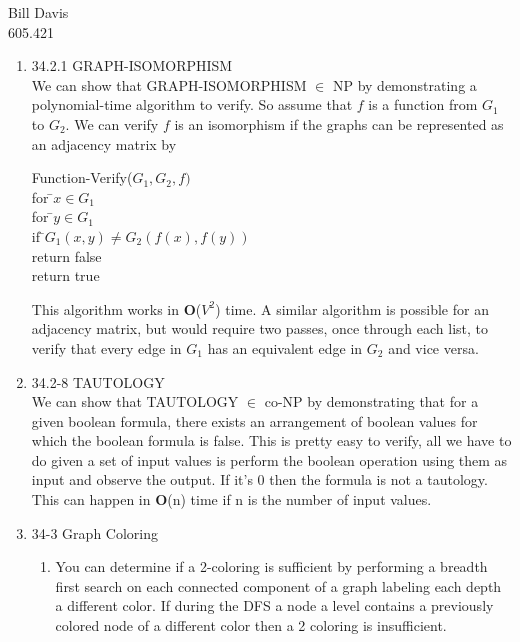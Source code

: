 \documentclass[11pt,fleqn]{article}
\begin{document}
\newcommand{\mbf}[1]{\mbox{{\bfseries #1}}}
\newcommand{\N}{\mbf{N}}
\renewcommand{\O}{\mbf{O}}

\noindent Bill Davis \\
605.421 

\begin{enumerate}
\item 34.2.1 GRAPH-ISOMORPHISM \\
We can show that GRAPH-ISOMORPHISM $\in$ NP by demonstrating a polynomial-time algorithm to verify. So assume that $f$ is a function from $G_{1}$ to $G_{2}$. We can verify $f$ is an isomorphism if the graphs can be represented as an adjacency matrix by
\begin{tabbing}
Function-Verify($G_{1},G_{2},f)$\\
for \=$x \in G_{1}$  \\
\> for \=$y \in G_{1}$ \\
\>  \> if \=$G_{1}(x,y) \neq G_{2}(f(x),f(y))$ \\
\>  \>  \> return false \\
return true 
\end{tabbing}

This algorithm works in \O($V^{2}$) time. A similar algorithm is possible for an adjacency matrix, but would require two passes, once through each list, to verify that every edge in $G_{1}$ has an equivalent edge in $G_{2}$ and vice versa. 

\item 
34.2-8 TAUTOLOGY\\
We can show that TAUTOLOGY $\in$ co-NP by demonstrating that for a given boolean formula, there exists an arrangement of boolean values for which the boolean formula is false. This is pretty easy to verify, all we have to do given a set of input values is perform the boolean operation using them as input and observe the output. If it's 0 then the formula is not a tautology. This can happen in \O(n) time if n is the number of input values. 

\item 34-3 Graph Coloring \\
\begin{enumerate}
\item You can determine if a 2-coloring is sufficient by performing a breadth first search on each connected component of a graph labeling each depth a different color. If during the DFS a node a level contains a previously colored node of a different color then a 2 coloring is insufficient. 


\end{enumerate}
\end{enumerate}
\end{document}
